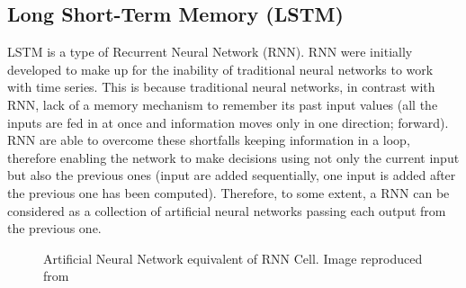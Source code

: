

\subsection{Long Short-Term Memory (LSTM)}

LSTM is a type of Recurrent Neural Network (RNN). RNN were initially developed to make up for the inability of traditional neural networks to work with time series. This is because traditional neural networks, in contrast with RNN, lack of a memory mechanism to remember its past input values (all the inputs are fed in at once and information moves only in one direction; forward). RNN are able to overcome these shortfalls keeping information in a loop, therefore enabling the network to make decisions using not only the current input but also the previous ones (input are added sequentially, one input is added after the previous one has been computed). Therefore, to some extent, a RNN can be considered as a collection of artificial neural networks passing each output from the previous one.

\begin{figure}[ht!]%
    \centering
    \qquad
    \caption{Artificial Neural Network equivalent of RNN Cell. Image reproduced from \cite{rnn}}%
    \label{fig:example}%
\end{figure}

